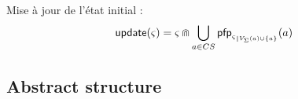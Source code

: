 \begin{comment}
==========================

Bonds possibles :
\begin{align*}
\bounceprocs_\ctx = \{ a_i \in \PHproc \mid \exists s \in \ctx, \exists \delta \in \restriction{\Sce}{k-1}, a_i \in (s \PHplay \delta) \}
\end{align*}
\end{comment}

Mise à jour de l'état initial :
\begin{align*}
  \update(\ctx) = \ctx \Cap \bigcup_{a \in CS} \pfp_{\restriction{\ctx}{\Vs(a) \cup \{ a \}}}(a)
\end{align*}


\begin{comment}
Séquences de bonds abstraites :
$$\BS^\wedge(P) = \{ \zeta^\wedge \mid \zeta \in \BS(P), \nexists \zeta' \in \BS(P), \zeta'^\wedge \subsetneq \zeta^\wedge \}$$
where $\zeta^\wedge = (\zeta^\wedge_A, \zeta^\wedge_B, \zeta^\wedge_{max})$ with:
\begin{itemize}
  \item $\zeta^\wedge_A = \{ \PHhitter(\zeta_n) \mid n \in \indexes{\zeta} \wedge \PHsort(\PHhitter(\zeta_n)) \neq \PHsort(P) \}$ : ens. des requis d'autres sortes (frappeurs)
  \item $\zeta^\wedge_B = \{ \PHhitter(\zeta_n) \mid n \in \indexes{\zeta} \} \cup \{ \PHtarget(\zeta_n) \mid n \in \indexes{\zeta} \}$ : ens. des processus nécessaires (à ne pas perturber)
  \item $\zeta^\wedge_{max} = \max_{n \in \indexes{\zeta}}(\prio(\zeta_n))$ : plus faible priorité
\end{itemize}
\end{comment}

\subsection{Abstract structure}

